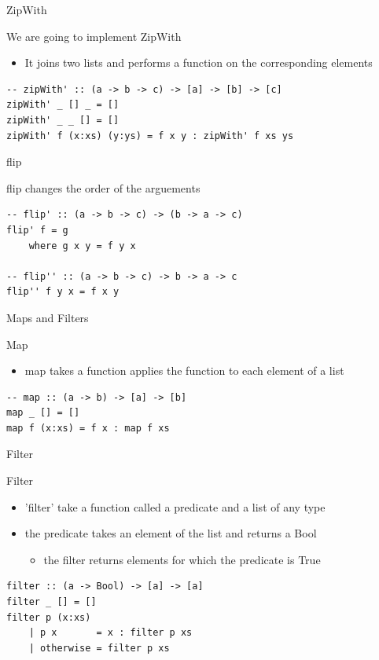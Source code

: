 \documentclass[presetation]{beamer}
\begin{document}
\begin{frame}[fragile,label={sec:org54c16f8}]{ZipWith}
 \begin{block}{We are going to implement ZipWith}
\begin{itemize}
\item It joins two lists and performs a function on the corresponding elements
\end{itemize}
\begin{verbatim}
-- zipWith' :: (a -> b -> c) -> [a] -> [b] -> [c]
zipWith' _ [] _ = []
zipWith' _ _ [] = []
zipWith' f (x:xs) (y:ys) = f x y : zipWith' f xs ys
\end{verbatim}
\end{block}
\end{frame}

\begin{frame}[fragile,label={sec:orgc68ea92}]{flip}
 \begin{block}{flip changes the order of the arguements}
\begin{verbatim}
-- flip' :: (a -> b -> c) -> (b -> a -> c)
flip' f = g
    where g x y = f y x

-- flip'' :: (a -> b -> c) -> b -> a -> c
flip'' f y x = f x y
\end{verbatim}
\end{block}
\end{frame}

\begin{frame}[fragile,label={sec:org20a1e9c}]{Maps and Filters}
 \begin{block}{Map}
\begin{itemize}
\item map takes a function applies the function to each element of a list
\end{itemize}
\begin{verbatim}
-- map :: (a -> b) -> [a] -> [b]
map _ [] = []
map f (x:xs) = f x : map f xs
\end{verbatim}
\end{block}
\end{frame}

\begin{frame}[fragile,label={sec:orga18c3b3}]{Filter}
 \begin{block}{Filter}
\begin{itemize}
\item 'filter' take a function called a predicate and a list of any type
\item the predicate takes an element of the list and returns a Bool
\begin{itemize}
\item the filter returns elements for which the predicate is True
\end{itemize}
\end{itemize}
\begin{verbatim}
filter :: (a -> Bool) -> [a] -> [a]
filter _ [] = []
filter p (x:xs) 
    | p x       = x : filter p xs
    | otherwise = filter p xs
\end{verbatim}
\end{block}
\end{frame}
\end{document}
